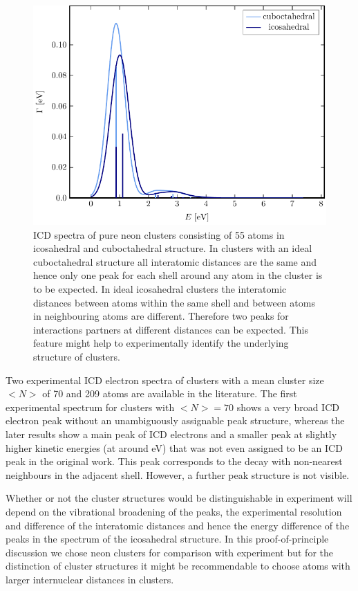 \begin{figure}[h]
 \centering
 \includegraphics[width=\columnwidth]{pics/reinNe}
 \caption{ICD spectra of pure neon clusters consisting of 55 atoms in
          icosahedral and cuboctahedral structure. In clusters with an
          ideal cuboctahedral structure
          all interatomic distances are the same and hence only one peak
          for each shell around any atom in the cluster is to be expected.
          In ideal icosahedral clusters the interatomic distances between atoms
          within the same shell and between atoms in neighbouring atoms
          are different. Therefore two peaks for interactions partners
          at different distances can be expected. This feature might
          help to experimentally identify the underlying structure of clusters.}
 \label{figure:reinNe}
\end{figure}

Two experimental ICD electron spectra of clusters
with a mean cluster size $<N>$ of 70 and 209 atoms
are available in the literature.
\cite{Marburger03,Barth06_2} 
The first experimental spectrum for clusters with $<N>=70$ shows a very
broad ICD electron peak without an unambiguously assignable peak structure,
whereas the later results show a main peak of ICD electrons and a smaller peak
at slightly higher kinetic energies (at around \unit[3]{eV})
that was not even assigned to be an ICD peak in the original work. This peak
corresponds to the decay with non-nearest neighbours in the adjacent shell.
However, a further peak
structure is not visible.

Whether or not the cluster structures would be distinguishable in experiment
will depend on the vibrational broadening of the peaks, the experimental
resolution and difference of the interatomic distances
and hence the energy difference of the peaks in the spectrum of the
icosahedral structure. In this proof-of-principle discussion
we chose neon clusters for comparison with experiment but for the distinction
of cluster structures it might be recommendable to choose atoms with larger
internuclear distances in clusters.

